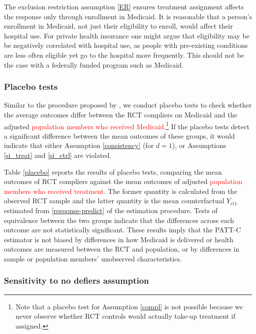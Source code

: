 \documentclass[hidelinks,12pt]{article}
\begin{document}
The exclusion restriction assumption \eqref{ER} ensures treatment assignment affects the response only through enrollment in Medicaid. It is reasonable that a person's enrollment in Medicaid, not just their eligibility to enroll, would affect their hospital use. For private health insurance one might argue that eligibility may be be negatively correlated with hospital use, as people with pre-existing conditions are less often eligible yet go to the hospital more frequently. This should not be the case with a federally funded program such as Medicaid. 

\subsubsection{Placebo tests} \label{placebo-tests}

Similar to the procedure proposed by \citep{Hartman}, we conduct placebo tests to check whether the average outcomes differ between the RCT compliers on Medicaid and the adjusted \textcolor{red}{population members who received Medicaid}.\footnote{Note that a placebo test for Assumption \eqref{compl} is not possible because we never observe whether RCT controls would actually take-up treatment if assigned.} If the placebo tests detect a significant difference between the mean outcomes of these groups, it would indicate that either Assumption \eqref{consistency} (for $d=1$), or Assumptions \eqref{si_treat} and \eqref{si_ctrl} are violated. 

Table \ref{placebo} reports the results of placebo tests, comparing the mean outcomes of RCT compliers against the mean outcomes of adjusted \textcolor{red}{population members who received treatment}. The former quantity is calculated from the observed RCT sample and the latter quantity is the mean counterfactual $Y_{i11}$ estimated from \ref{response-predict} of the estimation procedure. Tests of equivalence between the two groups indicate that the differences across each outcome are not statistically significant. These results imply that the PATT-C estimator is not biased by differences in how Medicaid is delivered or health outcomes are measured between the RCT and population, or by differences in sample or population members' unobserved characteristics. 

\subsubsection{Sensitivity to no defiers assumption} \label{sens-defiers}
\end{document}
